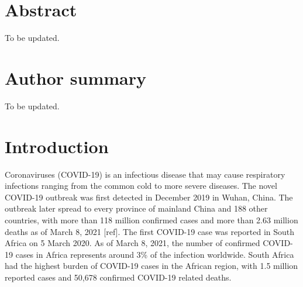 \documentclass[10pt,letterpaper]{article}
\newcommand{\getIndex}[2]{
  \ForEach{,}{\IfEq{#1}{\thislevelitem}{\number\thislevelcount\ExitForEach}{}}{#2}
}
\newcommand{\getAff}[1]{
  \getIndex{#1}{}
}
\begin{document}
\vspace*{0.2in}

\section*{Abstract}
To be updated.

\section*{Author summary}
To be updated.

\linenumbers

\hypertarget{introduction}{%
\section{Introduction}\label{introduction}}
Coronaviruses (COVID-19) is an infectious disease that may cause respiratory infections ranging from the common cold to more severe diseases. The novel COVID-19 outbreak was first detected in December 2019 in Wuhan, China. The outbreak later spread to every province of mainland China and 188 other countries, with more than 118 million confirmed cases and more than 2.63 million deaths as of March 8, 2021 [ref]. The first COVID-19 case was reported in South Africa
on 5 March 2020. As of March 8, 2021, the number of confirmed COVID-19 cases in Africa represents around 3\% of the infection worldwide. South Africa had the highest burden of COVID-19 cases in the African region, with 1.5 million reported cases and 50,678 confirmed COVID-19 related deaths.
\end{document}
